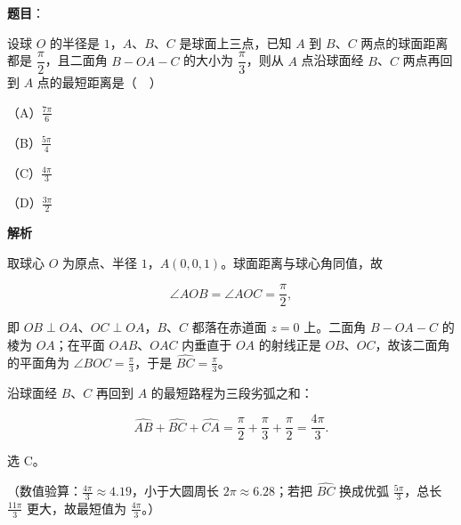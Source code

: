\begin{answer}

\textbf{题目}：

设球 $O$ 的半径是 $1$，$A$、$B$、$C$ 是球面上三点，已知 $A$ 到 $B$、$C$ 两点的球面距离都是 $\dfrac{\pi}{2}$，且二面角 $B-OA-C$ 的大小为 $\dfrac{\pi}{3}$，则从 $A$ 点沿球面经 $B$、$C$ 两点再回到 $A$ 点的最短距离是（　）
\nopagebreak[4]
\begin{center}\end{center}
\nopagebreak[4]
（A）$\frac{7\pi}{6}$

（B）$\frac{5\pi}{4}$

（C）$\frac{4\pi}{3}$

（D）$\frac{3\pi}{2}$

\textbf{解析}

取球心 $O$ 为原点、半径 $1$，$A(0,0,1)$。球面距离与球心角同值，故

\nopagebreak[4]
\[\angle AOB=\angle AOC=\frac{\pi}{2},\]

即 $OB\perp OA$、$OC\perp OA$，$B$、$C$ 都落在赤道面 $z=0$ 上。二面角 $B-OA-C$ 的棱为 $OA$；在平面 $OAB$、$OAC$ 内垂直于 $OA$ 的射线正是 $OB$、$OC$，故该二面角的平面角为 $\angle BOC=\frac{\pi}{3}$，于是 $\widehat{BC}=\frac{\pi}{3}$。

沿球面经 $B$、$C$ 再回到 $A$ 的最短路程为三段劣弧之和：

\nopagebreak[4]
\[\widehat{AB}+\widehat{BC}+\widehat{CA}=\frac{\pi}{2}+\frac{\pi}{3}+\frac{\pi}{2}=\frac{4\pi}{3}.\]

选 C。

（数值验算：$\frac{4\pi}{3}\approx4.19$，小于大圆周长 $2\pi\approx6.28$；若把 $\widehat{BC}$ 换成优弧 $\frac{5\pi}{3}$，总长 $\frac{11\pi}{3}$ 更大，故最短值为 $\frac{4\pi}{3}$。）


\end{answer}
